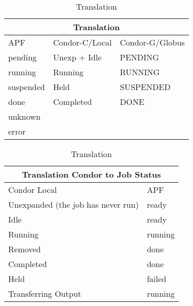 \documentclass[a4paper]{jpconf}
\begin{document}
\begin{table}
\begin{tabular}{|l|l|l|}
\hline
\hline
\multicolumn{3}{|c|}{Translation} \\
\hline
\hline
APF         &      Condor-C/Local      &        Condor-G/Globus \\ \hline 
\hline
\hline
pending     &      Unexp + Idle        &        PENDING         \\ \hline 
running     &      Running             &        RUNNING         \\ \hline 
suspended   &      Held                &        SUSPENDED       \\ \hline 
done        &      Completed           &        DONE            \\ \hline
unknown     &                          &                        \\ \hline    
error       &                          &                        \\ \hline
\end{tabular}\caption{Translation}
\label{translation}
\end{table}



\begin{table}
\begin{tabular}{|l|l|}
\hline
\hline
\multicolumn{2}{|c|}{Translation Condor to Job Status} \\
\hline
\hline
Condor Local   & APF       \\ \hline
\hline
\hline
Unexpanded (the job has never run)    &   ready      \\ \hline
Idle                                  &   ready      \\ \hline
Running                               &   running    \\ \hline
Removed                               &   done       \\ \hline
Completed                             &   done       \\ \hline
Held                                  &   failed     \\ \hline
Transferring Output                   &   running    \\ \hline
\end{tabular}\caption{Translation}
\label{translation}
\end{table}
\end{document}
